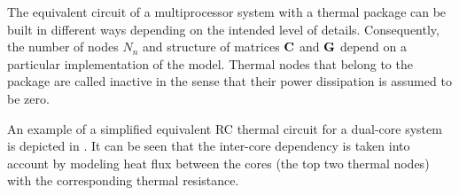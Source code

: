 The equivalent circuit of a multiprocessor system with a thermal package can be built in different ways depending on the intended level of details. Consequently, the number of nodes $N_n$ and structure of matrices $\mathbf{C}$ and $\mathbf{G}$ depend on a particular implementation of the model. Thermal nodes that belong to the package are called inactive in the sense that their power dissipation is assumed to be zero.

An example of a simplified equivalent RC thermal circuit for a dual-core system is depicted in . It can be seen that the inter-core dependency is taken into account by modeling heat flux between the cores (the top two thermal nodes) with the corresponding thermal resistance.
